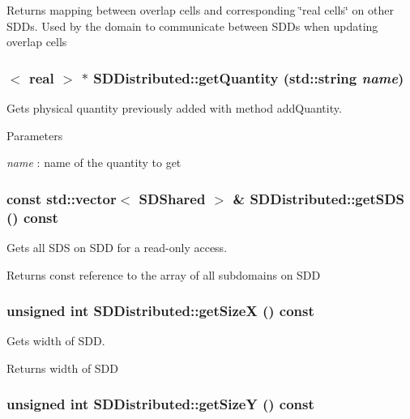 Returns mapping between overlap cells and corresponding \char`\"{}real cells\char`\"{} on other SDDs. Used by the domain to communicate between SDDs when updating overlap cells \hypertarget{classSDDistributed_a14f296606ff1afa1e4878fa6c4928afc}{
\subsubsection[{getQuantity}]{$<$ real $>$ $\ast$ SDDistributed::getQuantity (std::string {\em name})}}
\label{classSDDistributed_a14f296606ff1afa1e4878fa6c4928afc}


Gets physical quantity previously added with method addQuantity. 
\begin{DoxyParams}{Parameters}
\item[{\em name}]: name of the quantity to get \end{DoxyParams}
\hypertarget{classSDDistributed_a441ca869ca0246ea980d3d2fba4edb9b}{
\subsubsection[{getSDS}]{\setlength{\rightskip}{0pt plus 5cm}const std::vector$<$ {\bf SDShared} $>$ \& SDDistributed::getSDS () const}}
\label{classSDDistributed_a441ca869ca0246ea980d3d2fba4edb9b}


Gets all SDS on SDD for a read-\/only access. \begin{DoxyReturn}{Returns}
const reference to the array of all subdomains on SDD 
\end{DoxyReturn}
\hypertarget{classSDDistributed_ab4f67f6e409d05a77edc148902d67790}{
\subsubsection[{getSizeX}]{\setlength{\rightskip}{0pt plus 5cm}unsigned int SDDistributed::getSizeX () const}}
\label{classSDDistributed_ab4f67f6e409d05a77edc148902d67790}


Gets width of SDD. \begin{DoxyReturn}{Returns}
width of SDD 
\end{DoxyReturn}
\hypertarget{classSDDistributed_ab021a9aea5d9201a179e1cbec1b5c4fb}{
\subsubsection[{getSizeY}]{\setlength{\rightskip}{0pt plus 5cm}unsigned int SDDistributed::getSizeY () const}}
\label{classSDDistributed_ab021a9aea5d9201a179e1cbec1b5c4fb}


